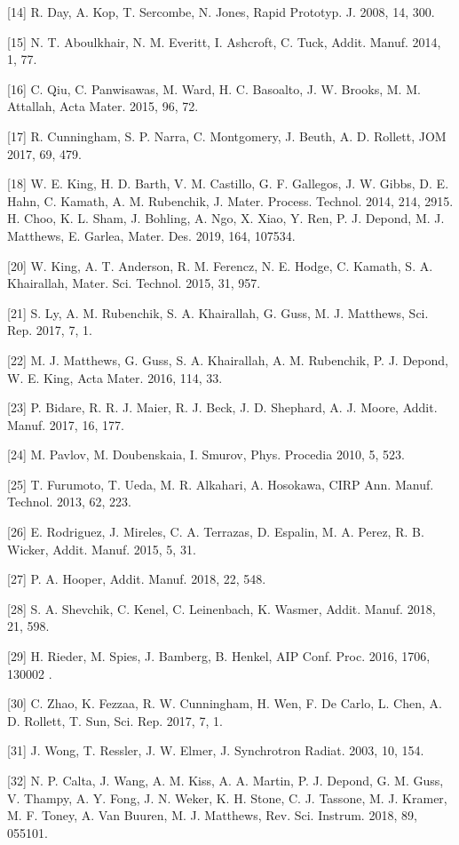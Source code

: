 \documentclass[10pt]{article}
\begin{document}
[14] R. Day, A. Kop, T. Sercombe, N. Jones, Rapid Prototyp. J. 2008, 14, 300.

[15] N. T. Aboulkhair, N. M. Everitt, I. Ashcroft, C. Tuck, Addit. Manuf. 2014, 1, 77.

[16] C. Qiu, C. Panwisawas, M. Ward, H. C. Basoalto, J. W. Brooks, M. M. Attallah, Acta Mater. 2015, 96, 72.

[17] R. Cunningham, S. P. Narra, C. Montgomery, J. Beuth, A. D. Rollett, JOM 2017, 69, 479.

[18] W. E. King, H. D. Barth, V. M. Castillo, G. F. Gallegos, J. W. Gibbs, D. E. Hahn, C. Kamath, A. M. Rubenchik, J. Mater. Process. Technol. 2014, 214, 2915.\\
[19] H. Choo, K. L. Sham, J. Bohling, A. Ngo, X. Xiao, Y. Ren, P. J. Depond, M. J. Matthews, E. Garlea, Mater. Des. 2019, 164, 107534.

[20] W. King, A. T. Anderson, R. M. Ferencz, N. E. Hodge, C. Kamath, S. A. Khairallah, Mater. Sci. Technol. 2015, 31, 957.

[21] S. Ly, A. M. Rubenchik, S. A. Khairallah, G. Guss, M. J. Matthews, Sci. Rep. 2017, 7, 1.

[22] M. J. Matthews, G. Guss, S. A. Khairallah, A. M. Rubenchik, P. J. Depond, W. E. King, Acta Mater. 2016, 114, 33.

[23] P. Bidare, R. R. J. Maier, R. J. Beck, J. D. Shephard, A. J. Moore, Addit. Manuf. 2017, 16, 177.

[24] M. Pavlov, M. Doubenskaia, I. Smurov, Phys. Procedia 2010, 5, 523.

[25] T. Furumoto, T. Ueda, M. R. Alkahari, A. Hosokawa, CIRP Ann. Manuf. Technol. 2013, 62, 223.

[26] E. Rodriguez, J. Mireles, C. A. Terrazas, D. Espalin, M. A. Perez, R. B. Wicker, Addit. Manuf. 2015, 5, 31.

[27] P. A. Hooper, Addit. Manuf. 2018, 22, 548.

[28] S. A. Shevchik, C. Kenel, C. Leinenbach, K. Wasmer, Addit. Manuf. 2018, 21, 598.

[29] H. Rieder, M. Spies, J. Bamberg, B. Henkel, AIP Conf. Proc. 2016, 1706, 130002 .

[30] C. Zhao, K. Fezzaa, R. W. Cunningham, H. Wen, F. De Carlo, L. Chen, A. D. Rollett, T. Sun, Sci. Rep. 2017, 7, 1.

[31] J. Wong, T. Ressler, J. W. Elmer, J. Synchrotron Radiat. 2003, 10, 154.

[32] N. P. Calta, J. Wang, A. M. Kiss, A. A. Martin, P. J. Depond, G. M. Guss, V. Thampy, A. Y. Fong, J. N. Weker, K. H. Stone, C. J. Tassone, M. J. Kramer, M. F. Toney, A. Van Buuren, M. J. Matthews, Rev. Sci. Instrum. 2018, 89, 055101.
\end{document}

